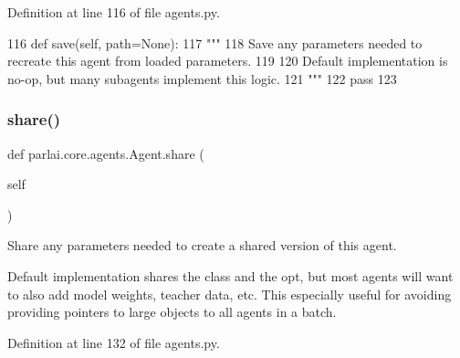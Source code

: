 Definition at line 116 of file agents.\+py.


\begin{DoxyCode}
116     \textcolor{keyword}{def }save(self, path=None):
117         \textcolor{stringliteral}{"""}
118 \textcolor{stringliteral}{        Save any parameters needed to recreate this agent from loaded parameters.}
119 \textcolor{stringliteral}{}
120 \textcolor{stringliteral}{        Default implementation is no-op, but many subagents implement this logic.}
121 \textcolor{stringliteral}{        """}
122         \textcolor{keywordflow}{pass}
123 
\end{DoxyCode}
\mbox{\label{classparlai_1_1core_1_1agents_1_1Agent_afbbb06bf0f46ff927c8b186726a68b47}} 
\subsubsection{\texorpdfstring{share()}{share()}}
{\footnotesize\ttfamily def parlai.\+core.\+agents.\+Agent.\+share (\begin{DoxyParamCaption}\item[{}]{self }\end{DoxyParamCaption})}

\begin{DoxyVerb}Share any parameters needed to create a shared version of this agent.

Default implementation shares the class and the opt, but most agents will want
to also add model weights, teacher data, etc. This especially useful for
avoiding providing pointers to large objects to all agents in a batch.
\end{DoxyVerb}
 

Definition at line 132 of file agents.\+py.


